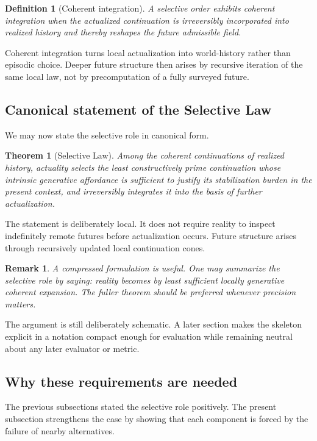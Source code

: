 \documentclass[11pt]{article}
\theoremstyle{foundation}
\newtheorem{theorem}{Theorem}
\newtheorem{definition}{Definition}
\newtheorem{remark}{Remark}
\begin{document}
\begin{definition}[Coherent integration]
A selective order exhibits coherent integration when the actualized continuation is irreversibly incorporated into realized history and thereby reshapes the future admissible field.
\end{definition}

Coherent integration turns local actualization into world-history rather than episodic choice. Deeper future structure then arises by recursive iteration of the same local law, not by precomputation of a fully surveyed future.

\subsection{Canonical statement of the Selective Law}

We may now state the selective role in canonical form.

\begin{theorem}[Selective Law]
Among the coherent continuations of realized history, actuality selects the least constructively prime continuation whose intrinsic generative affordance is sufficient to justify its stabilization burden in the present context, and irreversibly integrates it into the basis of further actualization.
\end{theorem}

The statement is deliberately local. It does not require reality to inspect indefinitely remote futures before actualization occurs. Future structure arises through recursively updated local continuation cones.

\begin{remark}
A compressed formulation is useful. One may summarize the selective role by saying: \emph{reality becomes by least sufficient locally generative coherent expansion}. The fuller theorem should be preferred whenever precision matters.
\end{remark}

The argument is still deliberately schematic. A later section makes the skeleton explicit in a notation compact enough for evaluation while remaining neutral about any later evaluator or metric.

\subsection{Why these requirements are needed}

The previous subsections stated the selective role positively. The present subsection strengthens the case by showing that each component is forced by the failure of nearby alternatives.
\end{document}
